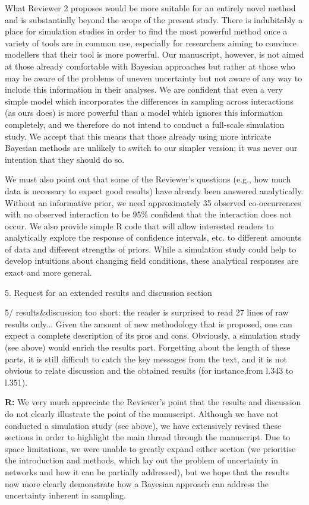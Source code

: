 \documentclass[12pt]{letter}
\newenvironment{refquote}{\bigskip \begin{it}}{\end{it}\smallskip}
\begin{document}
		What Reviewer 2 proposes would be more suitable for an entirely novel method and is substantially beyond the scope of the present study. There is indubitably a place for simulation studies in order to find the most powerful method once a variety of tools are in common use, especially for researchers aiming to convince modellers that their tool is more powerful. Our manuscript, however, is not aimed at those already comfortable with Bayesian approaches but rather at those who may be aware of the problems of uneven uncertainty but not aware of any way to include this information in their analyses. We are confident that even a very simple model which incorporates the differences in sampling across interactions (as ours does) is more powerful than a model which ignores this information completely, and we therefore do not intend to conduct a full-scale simulation study. We accept that this means that those already using more intricate Bayesian methods are unlikely to switch to our simpler version; it was never our intention that they should do so.


		We must also point out that some of the Reviewer's questions (e.g., how much data is necessary to expect good results) have already been answered analytically. Without an informative prior, we need approximately 35 observed co-occurrences with no observed interaction to be 95\% confident that the interaction does not occur. We also provide simple R code that will allow interested readers to analytically explore the response of confidence intervals, etc. to different amounts of data and different strengths of priors. While a simulation study could help to develop intuitions about changing field conditions, these analytical responses are exact and more general.


	5. Request for an extended results and discussion section


		\begin{refquote}
			5/ results\&discussion too short: the reader is surprised to read 27 lines of raw results only... Given the amount of new methodology that is proposed, one can expect a complete description of its pros and cons. Obviously, a simulation study (see above) would enrich the results part. Forgetting about the length of these parts, it is still difficult to catch the key messages from the text, and it is not obvious to relate discussion and the obtained results (for instance,from l.343 to l.351).
		\end{refquote}


		\textbf{R:} We very much appreciate the Reviewer's point that the results and discussion do not clearly illustrate the point of the manuscript. Although we have not conducted a simulation study (see above), we have extensively revised these sections in order to highlight the main thread through the manuscript. Due to space limitations, we were unable to greatly expand either section (we prioritise the introduction and methods, which lay out the problem of uncertainty in networks and how it can be partially addressed), but we hope that the results now more clearly demonstrate how a Bayesian approach can address the uncertainty inherent in sampling.
\end{document}
